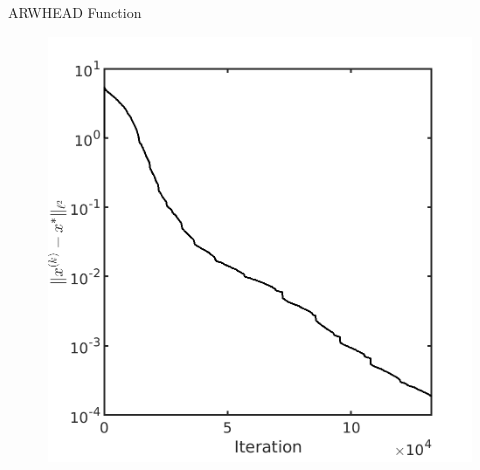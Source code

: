 \documentclass{beamer}
\begin{document}
\begin{frame}{ARWHEAD Function}
\begin{figure}[!htbp]
	  \includegraphics[scale=0.174]{./figures/arwhead640D_dist.png}
\end{figure}
\end{frame}
\end{document}
